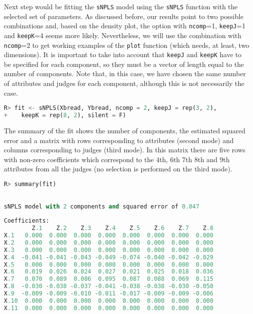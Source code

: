 Next step would be fitting the \texttt{sNPLS} model using the \texttt{sNPLS} function with the selected set of parameters. As discussed before, our results point to two possible combinations and, based on the density plot, the option with \texttt{ncomp}=1, \texttt{keepJ}=1 and \texttt{keepK}=4 seems more likely. Nevertheless, we will use the combination with \texttt{ncomp}=2 to get working examples of the \texttt{plot} function (which needs, at least, two dimensions). It is important to take into account that \texttt{keepJ} and \texttt{keepK} have to be specified for each component, so they must be a vector of length equal to the number of components. Note that, in this case, we have chosen the same number of attributes and judges for each component, although this is not necessarily the case.

\vspace{15pt}
\begin{lstlisting}[basicstyle=\small, language=Python]
R> fit <- sNPLS(Xbread, Ybread, ncomp = 2, keepJ = rep(3, 2), 
+    keepK = rep(8, 2), silent = F)
\end{lstlisting}   

The summary of the fit shows the number of components, the estimated squared error and a matrix with rows corresponding to attributes (second mode) and columns corresponding to judges (third mode). In this matrix there are five rows with non-zero coefficients which correspond to the 4th, 6th 7th 8th and 9th attributes from all the judges (no selection is performed on the third mode).

\vspace{15pt}
\begin{lstlisting}[basicstyle=\small, language=Python]
R> summary(fit)
\end{lstlisting}   

\begin{lstlisting}[basicstyle=\small, backgroundcolor=\color{output}, numbers=none, label={output4}, language=Python, caption=Summary with the coefficients of the fitted model.]

sNPLS model with 2 components and squared error of 0.047 
 
Coefficients: 
        Z.1    Z.2    Z.3    Z.4    Z.5    Z.6    Z.7    Z.8
X.1   0.000  0.000  0.000  0.000  0.000  0.000  0.000  0.000
X.2   0.000  0.000  0.000  0.000  0.000  0.000  0.000  0.000
X.3   0.000  0.000  0.000  0.000  0.000  0.000  0.000  0.000
X.4  -0.041 -0.041 -0.043 -0.049 -0.074 -0.040 -0.042 -0.029
X.5   0.000  0.000  0.000  0.000  0.000  0.000  0.000  0.000
X.6   0.019  0.026  0.024  0.027  0.021  0.025  0.018  0.036
X.7   0.070  0.089  0.086  0.095  0.087  0.088  0.069  0.115
X.8  -0.030 -0.038 -0.037 -0.041 -0.038 -0.038 -0.030 -0.050
X.9  -0.009 -0.009 -0.010 -0.011 -0.017 -0.009 -0.009 -0.006
X.10  0.000  0.000  0.000  0.000  0.000  0.000  0.000  0.000
X.11  0.000  0.000  0.000  0.000  0.000  0.000  0.000  0.000
\end{lstlisting}  

